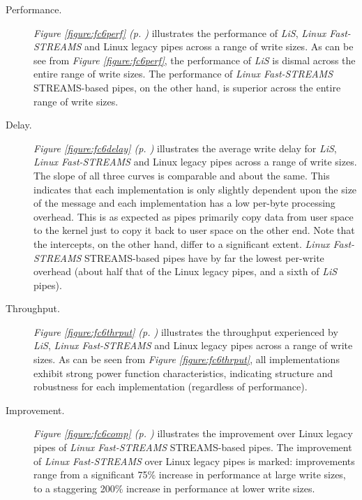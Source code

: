 \documentclass[letterpaper,final,notitlepage,twocolumn,10pt,twoside]{article}
\begin{document}
\begin{description}

\item[Performance.]

\textit{Figure \ref{figure:fc6perf} (p. \pageref{figure:fc6perf})} illustrates
the performance of \textsl{LiS}, \textsl{Linux Fast-STREAMS} and Linux legacy
pipes across a range of write sizes.  As can be see from \textit{Figure
\ref{figure:fc6perf}}, the performance of \textsl{LiS} is dismal across the
entire range of write sizes.  The performance of \textsl{Linux Fast-STREAMS}
STREAMS-based pipes, on the other hand, is superior across the entire range of
write sizes.

\item[Delay.]

\textit{Figure \ref{figure:fc6delay} (p. \pageref{figure:fc6delay})}
illustrates the average write delay for \textsl{LiS}, \textsl{Linux
Fast-STREAMS} and Linux legacy pipes across a range of write sizes.  The slope
of all three curves is comparable and about the same.  This indicates that
each implementation is only slightly dependent upon the size of the message
and each implementation has a low per-byte processing overhead.  This is as
expected as pipes primarily copy data from user space to the kernel just to
copy it back to user space on the other end.  Note that the intercepts, on the
other hand, differ to a significant extent.  \textsl{Linux Fast-STREAMS}
STREAMS-based pipes have by far the lowest per-write overhead (about half that
of the Linux legacy pipes, and a sixth of \textsl{LiS} pipes).

\item[Throughput.]

\textit{Figure \ref{figure:fc6thrput} (p. \pageref{figure:fc6thrput})}
illustrates the throughput experienced by \textsl{LiS}, \textsl{Linux
Fast-STREAMS} and Linux legacy pipes across a range of write sizes.  As can be
seen from \textit{Figure \ref{figure:fc6thrput}}, all implementations exhibit
strong power function characteristics, indicating structure and robustness for
each implementation (regardless of performance).

\item[Improvement.]

\textit{Figure \ref{figure:fc6comp} (p. \pageref{figure:fc6comp})} illustrates
the improvement over Linux legacy pipes of \textsl{Linux Fast-STREAMS}
STREAMS-based pipes.  The improvement of \textsl{Linux Fast-STREAMS} over
Linux legacy pipes is marked: improvements range from a significant 75\%
increase in performance at large write sizes, to a staggering 200\% increase
in performance at lower write sizes.

\end{description}
\end{document}
